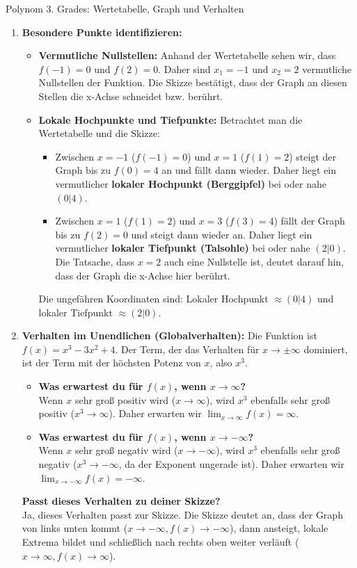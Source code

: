 \begin{loesungsumgebung}{Polynom 3. Grades: Wertetabelle, Graph und Verhalten}
\begin{enumerate}[label=(\alph*)]
    \item \textbf{Besondere Punkte identifizieren:}
    \begin{itemize}
        \item \textbf{Vermutliche Nullstellen:}
        Anhand der Wertetabelle sehen wir, dass $f(-1)=0$ und $f(2)=0$. Daher sind $x_1 = -1$ und $x_2 = 2$ vermutliche Nullstellen der Funktion. Die Skizze bestätigt, dass der Graph an diesen Stellen die x-Achse schneidet bzw. berührt.
        \item \textbf{Lokale Hochpunkte und Tiefpunkte:}
        Betrachtet man die Wertetabelle und die Skizze:
        \begin{itemize}
            \item Zwischen $x=-1$ ($f(-1)=0$) und $x=1$ ($f(1)=2$) steigt der Graph bis zu $f(0)=4$ an und fällt dann wieder. Daher liegt ein vermutlicher \textbf{lokaler Hochpunkt (Berggipfel)} bei oder nahe $(0|4)$.
            \item Zwischen $x=1$ ($f(1)=2$) und $x=3$ ($f(3)=4$) fällt der Graph bis zu $f(2)=0$ und steigt dann wieder an. Daher liegt ein vermutlicher \textbf{lokaler Tiefpunkt (Talsohle)} bei oder nahe $(2|0)$. Die Tatsache, dass $x=2$ auch eine Nullstelle ist, deutet darauf hin, dass der Graph die x-Achse hier berührt.
        \end{itemize}
        Die ungefähren Koordinaten sind: Lokaler Hochpunkt $\approx (0|4)$ und lokaler Tiefpunkt $\approx (2|0)$.
    \end{itemize}

    \item \textbf{Verhalten im Unendlichen (Globalverhalten):}
    Die Funktion ist $f(x) = x^3 - 3x^2 + 4$. Der Term, der das Verhalten für $x \to \pm\infty$ dominiert, ist der Term mit der höchsten Potenz von $x$, also $x^3$.
    \begin{itemize}
        \item \textbf{Was erwartest du für $f(x)$, wenn $x \to \infty$?} \\
        Wenn $x$ sehr groß positiv wird ($x \to \infty$), wird $x^3$ ebenfalls sehr groß positiv ($x^3 \to \infty$).
        Daher erwarten wir $\lim_{x \to \infty} f(x) = \infty$.
        \item \textbf{Was erwartest du für $f(x)$, wenn $x \to -\infty$?} \\
        Wenn $x$ sehr groß negativ wird ($x \to -\infty$), wird $x^3$ ebenfalls sehr groß negativ ($x^3 \to -\infty$, da der Exponent ungerade ist).
        Daher erwarten wir $\lim_{x \to -\infty} f(x) = -\infty$.
    \end{itemize}
    \textbf{Passt dieses Verhalten zu deiner Skizze?} \\
    Ja, dieses Verhalten passt zur Skizze. Die Skizze deutet an, dass der Graph von links unten kommt ($x \to -\infty, f(x) \to -\infty$), dann ansteigt, lokale Extrema bildet und schließlich nach rechts oben weiter verläuft ($x \to \infty, f(x) \to \infty$).
\end{enumerate}

\end{loesungsumgebung}